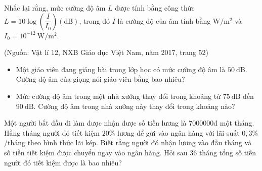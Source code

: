 \begin{bt}%
	Nhắc lại rằng, mức cường độ âm $L$ được tính bằng công thức $L=10 \log \left(\dfrac{I}{I_0}\right)(\mathrm{dB})$, trong đó $I$ là cường độ của âm tính bằng $\mathrm{W}/ \mathrm{m}^2$ và $I_0=10^{-12} \mathrm{~W} / \mathrm{m}^2$.
	\begin{flushright}
		(Nguồn: Vật lí 12, NXB Giáo dục Việt Nam, năm 2017, trang 52)
	\end{flushright}
	\begin{itemize}
		\item[a)] Một giáo viên đang giảng bài trong lớp học có mức cường độ âm là $50 \mathrm{~dB}$. Cường độ âm của giọng nói giáo viên bằng bao nhiêu?
		\item[b)] Mức cường độ âm trong một nhà xưởng thay đổi trong khoảng từ $75 \mathrm{~dB}$ đến $90 \mathrm{~dB}$. Cường độ âm trong nhà xưởng này thay đổi trong khoảng nào?
	\end{itemize}
\end{bt}

\begin{bt}%
	Một người bắt đầu đi làm được nhận được số tiền lương là $7000000$đ một tháng. Hằng tháng người đó tiết kiệm $20\%$ lương để gửi vào ngân hàng với lãi suất $0{,}3\%$/tháng theo hình thức lãi kép. Biết rằng người đó nhận lương vào đầu tháng và số tiền tiết kiệm được chuyển ngay vào ngân hàng. Hỏi sau $36$ tháng tổng số tiền người đó tiết kiệm được là bao nhiêu?
\end{bt}
